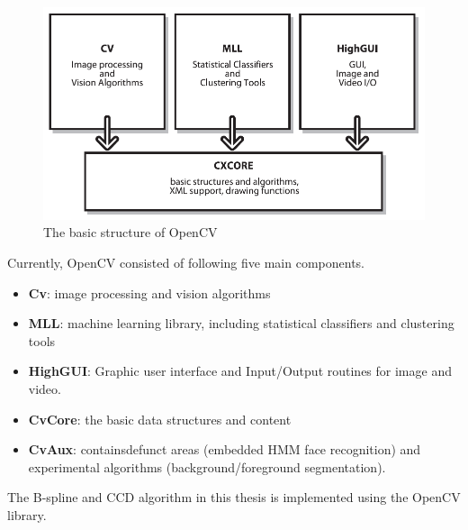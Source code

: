 \begin{figure}[htbp]
  \centering
\includegraphics[width=\linewidth]{images/bsopencv.png}
  \caption{The basic structure of OpenCV\cite{bradski2008learning}}
  \label{fig:bsopencv}
\end{figure}

Currently, OpenCV consisted of following five main components\cite{bradski2008learning}.
\begin{itemize}
\item \textbf{Cv}: image processing and vision algorithms
\item \textbf{MLL}: machine learning library, including statistical classifiers and clustering tools
\item \textbf{HighGUI}: Graphic user interface and Input/Output
  routines for image and video.
\item \textbf{CvCore}: the basic data structures and content
\item \textbf{CvAux}: containsdefunct areas (embedded HMM face
  recognition) and experimental algorithms (background/foreground
  segmentation).
\end{itemize}

The B-spline and CCD algorithm in this thesis is implemented using the
OpenCV library.


